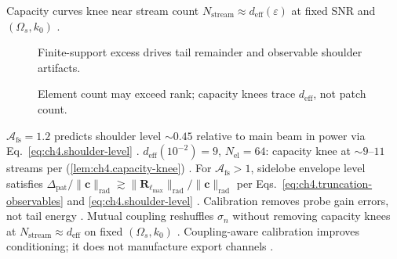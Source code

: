 \label{lem:ch4.capacity-knee}
Capacity curves knee near stream count \(N_{\mathrm{stream}}\approx d_{\mathrm{eff}}(\varepsilon)\) at fixed SNR and \((\Omega_{s},k_{0})\)
\cite{stratton1941}.
\begin{figure}[t]
\centering
{}
\caption{Finite-support excess drives tail remainder and observable shoulder artifacts.}
\label{fig:ch4.truncation-signatures}
\end{figure}
\begin{figure}[t]
\centering
{}
\caption{Element count may exceed rank; capacity knees trace \(d_{\mathrm{eff}}\), not patch count.}
\label{fig:ch4.capacity-knee-map}
\end{figure}
\(\mathcal{A}_{\mathrm{fs}}=1.2\) predicts shoulder level \(\sim0.45\) relative to main beam in power via Eq.~\eqref{eq:ch4.shoulder-level}
\cite{hansen1988}.
\(d_{\mathrm{eff}}(10^{-2})=9\), \(N_{\mathrm{el}}=64\): capacity knee at \(\sim9\)--\(11\) streams per (\ref{lem:ch4.capacity-knee})
\cite{harrington2001}.
For \(\mathcal{A}_{\mathrm{fs}}>1\), sidelobe envelope level satisfies
\(\Delta_{\mathrm{pat}}/\|\mathbf{c}\|_{\mathrm{rad}}\gtrsim\|\mathbf{R}_{\ell_{\max}}\|_{\mathrm{rad}}/\|\mathbf{c}\|_{\mathrm{rad}}\) per
Eqs.~\eqref{eq:ch4.truncation-observables} and \eqref{eq:ch4.shoulder-level} \cite{stratton1941}.
Calibration removes probe gain errors, not tail energy \cite{harrington2001}.
Mutual coupling reshuffles \(\sigma_{n}\) without removing capacity knees at \(N_{\mathrm{stream}}\approx d_{\mathrm{eff}}\) on fixed \((\Omega_{s},k_{0})\)
\cite{harrington2001}. Coupling-aware calibration improves conditioning; it does not manufacture export channels
\cite{jackson1999}.
